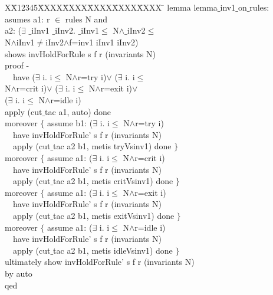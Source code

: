 \documentclass[final]{IEEEtran}
\newlength{\fminilength}
\newenvironment{fmini}[1][\linewidth]
  {\setlength{\fminilength}{#1\fboxsep-2\fboxrule}%
   \vspace{2ex}\noindent\begin{lrbox}{\fminibox}\begin{minipage}{\fminilength}%
   \mbox{ }\hfill\vspace{-2.5ex}}%
  {\end{minipage}\end{lrbox}\vspace{1ex}\hspace{0ex}%
   \framebox{\usebox{\fminibox}}}
\newenvironment{specification}
{\noindent\scriptsize
\tt\begin{fmini}\begin{tabbing}X\=X12345\=XXXX\=XXXX\=XXXX\=XXXX\=XXXX
\=\+\kill} {\end{tabbing}\normalfont\end{fmini}}
\def \twoSpaces {\ \ }
\def \iInv {iInv}
\begin{document}
\begin{specification}
lemma lemma$\_$inv1$\_$on$\_$rules:\\
  asumes a1:
r $\in$ rules N
 and \\
 a2:
($\exists$ $\_$iInv1 $\_$iInv2. $\_$iInv1$\le$
N$\wedge$$\_$iInv2$\le$\\
N$\wedge$\iInv1$\neq$\iInv2$\wedge$f=inv1  \iInv1 \iInv2)\\

 shows
invHoldForRule s f r (invariants N)\\

  proof -\\
\twoSpaces  have
($\exists$ i. i$\le$
N$\wedge$r=try  i)$\vee$
    ($\exists$ i. i$\le$\\
N$\wedge$r=crit  i)$\vee$
    ($\exists$ i. i$\le$
N$\wedge$r=exit  i)$\vee$\\
    ($\exists$ i. i$\le$
N$\wedge$r=idle  i)\\

  apply (cut$\_$tac a1, auto) done\\
    moreover $\{$      assume b1:
($\exists$ i. i$\le$
N$\wedge$r=try  i)\\

\twoSpaces      have invHoldForRule' s f r (invariants N)\\

\twoSpaces      apply (cut$\_$tac a2 b1, metis tryVsinv1) done
    $\}$\\


    moreover $\{$ assume a1:
($\exists$ i. i$\le$
N$\wedge$r=crit  i)\\

\twoSpaces      have
invHoldForRule' s f r (invariants N)\\

\twoSpaces      apply (cut$\_$tac a2 b1, metis critVsinv1) done
    $\}$\\


    moreover $\{$
      assume a1:
($\exists$ i. i$\le$
N$\wedge$r=exit  i)\\

\twoSpaces      have
invHoldForRule' s f r (invariants N)\\

\twoSpaces      apply (cut$\_$tac a2 b1, metis exitVsinv1) done
    $\}$\\


    moreover $\{$ assume a1:
($\exists$ i. i$\le$
N$\wedge$r=idle  i)\\

\twoSpaces      have
invHoldForRule' s f r (invariants N)\\

\twoSpaces      apply (cut$\_$tac a2 b1, metis idleVsinv1) done
    $\}$\\


  ultimately show invHoldForRule' s f r (invariants N)\\
  by auto\\
qed\\

\end{specification}
\end{document}
